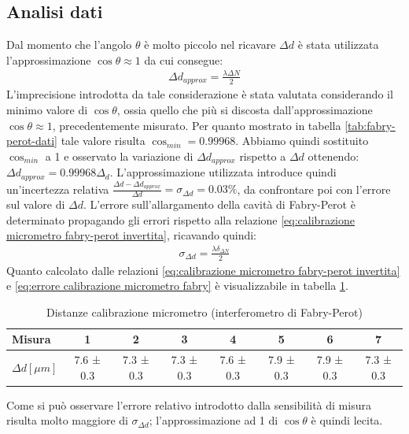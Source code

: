 \documentclass[a4paper]{article}
\begin{document}
\subsection{Analisi dati}
Dal momento che l'angolo $\theta$ è molto piccolo nel ricavare $\Delta d$ è stata utilizzata l'approssimazione $\cos{\theta}\approx1$ da cui consegue:
\begin{align}
    \Delta d_{approx} = \frac{\lambda \Delta N}{2}
\label{eq:calibrazione micrometro fabry-perot invertita}
\end{align}
L'imprecisione introdotta da tale considerazione è stata valutata considerando il minimo valore di $\cos{\theta}$, ossia quello che più si discosta dall'approssimazione $\cos{\theta}\approx1$, precedentemente misurato. Per quanto mostrato in tabella \ref{tab:fabry-perot-dati} tale valore risulta $\cos_{min}=0.99968$.
Abbiamo quindi sostituito $\cos_{min}$ a 1 e osservato la variazione di $\Delta d_{approx}$ rispetto a $\Delta d$ ottenendo: $\Delta d_{approx} = 0.99968\Delta_d$. L'approssimazione utilizzata introduce quindi un'incertezza relativa $\frac{\Delta d- \Delta d_{approx}}{\Delta d}=\sigma_{\Delta d}=0.03\%$, da confrontare poi con l'errore sul valore di $\Delta d$.
L'errore sull'allargamento della cavità di Fabry-Perot è determinato propagando gli errori rispetto alla relazione \ref{eq:calibrazione micrometro fabry-perot invertita}, ricavando quindi:
\begin{align}
   \sigma_{\Delta d}= \frac{\lambda \delta_{\Delta N}}{2}
\label{eq:errore calibrazione micrometro fabry}
\end{align}
Quanto calcolato dalle relazioni \ref{eq:calibrazione micrometro fabry-perot invertita} e \ref{eq:errore calibrazione micrometro fabry} è visualizzabile in tabella \ref{tab: distanze calibrazione fabry-perot}.
\begin{table}[htbp]
\centering
\caption{Distanze calibrazione micrometro (interferometro di Fabry-Perot)}
\begin{tabular}{|l|ccccccc|}
\hline
Misura & 1 & 2 & 3 & 4 & 5 & 6 & 7 \\\hline\hline
$\Delta d [\mu m]$ & 7.6 ± 0.3  & 7.3 ± 0.3  & 7.3 ± 0.3  & 7.6 ± 0.3  & 7.9 ± 0.3 & 7.9 ± 0.3 & 7.3 ± 0.3 \\\hline
\end{tabular}
\label{tab: distanze calibrazione fabry-perot}
\end{table}
Come si può osservare l'errore relativo introdotto dalla sensibilità di misura risulta molto maggiore di $\sigma_{\Delta d}$; l'approssimazione ad 1 di $\cos{\theta}$ è quindi lecita.
\end{document}
